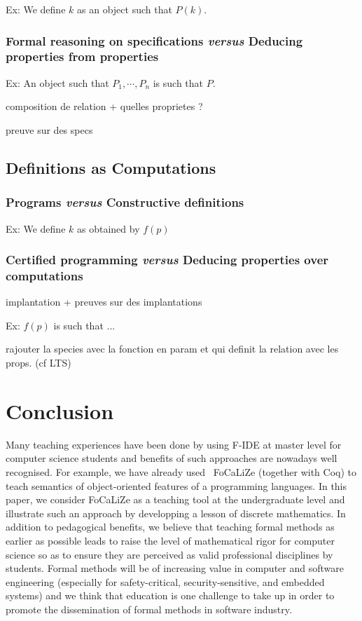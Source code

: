 \documentclass[submission,copyright,creativecommons]{eptcs}
\def\focalize{FoCaLiZe \mbox{}}
\begin{document}
Ex: We define $k$ as an object such that $P(k)$.

\subsubsection{Formal reasoning on specifications {\it versus} Deducing
  properties from properties}

Ex: An object such that $P_1, \cdots, P_n$ is such that $P$.

composition de relation + quelles proprietes  ? 

preuve sur des specs

\subsection{Definitions as Computations}

\subsubsection{Programs {\it versus} Constructive definitions}

Ex: We define $k$ as obtained by $f(p)$

\subsubsection{Certified programming {\it versus} Deducing properties
  over computations}

implantation + preuves sur des implantations

Ex: $f(p)$ is such that ...

rajouter la species avec la fonction en param et qui definit la
relation avec les props. (cf LTS)


\section{Conclusion}

Many teaching experiences have been done by using F-IDE at master
level for computer science students and benefits of such approaches
are nowadays well recognised. For example, we have already
used~\cite{Coq-Ens} \focalize (together with Coq) to teach semantics of
object-oriented features of a programming languages. 
In this paper, we consider \focalize as a teaching tool at the
undergraduate level and illustrate such an approach by developping
a lesson of
discrete mathematics.
In addition to pedagogical benefits, 
we believe that teaching formal methods as earlier as possible leads to
raise the level of mathematical rigor for computer science so as to
ensure they are perceived as valid professional disciplines by
students. 
Formal methods will be of
increasing value in computer and software engineering (especially for 
safety-critical, security-sensitive, and embedded systems)
and we think that education is one challenge to take up 
in order to promote the dissemination of formal methods in software industry.
\end{document}
